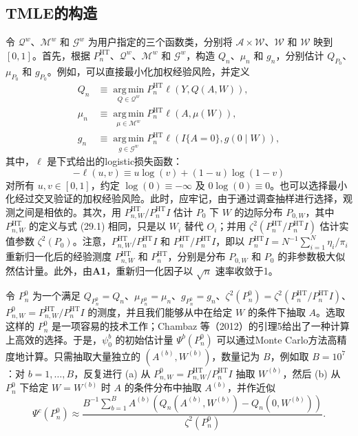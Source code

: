 \subsection{TMLE的构造}

令 $\mathcal Q^w$、$\mathcal M^w$ 和 $\mathcal G^w$ 为用户指定的三个函数类，分别将 $\mathcal A\times\mathcal W$、$\mathcal W$ 和 $\mathcal W$ 映到 $[0,1]$。首先，根据 $P_n^{\mathrm{HT}}$、$\mathcal Q^w$、$\mathcal M^w$ 和 $\mathcal G^w$，构造 $Q_n$、$\mu_n$ 和 $g_n$，分别估计 $Q_{P_0}$、$\mu_{P_0}$ 和 $g_{P_0}$。例如，可以直接最小化加权经验风险，并定义
\[
\begin{aligned}
Q_n&\equiv\operatorname*{arg\,min}_{Q\in\mathcal Q^w}
P_n^{\mathrm{HT}}\ell(Y,Q(A,W)),\\
\mu_n&\equiv\operatorname*{arg\,min}_{\mu\in\mathcal M^w}
P_n^{\mathrm{HT}}\ell(A,\mu(W)),\\
g_n&\equiv\operatorname*{arg\,min}_{g\in\mathcal G^w}
P_n^{\mathrm{HT}}\ell(I\{A=0\},g(0\mid W)),
\end{aligned}
\]
其中，$\ell$ 是下式给出的logistic损失函数：
\[
-\ell(u,v)\equiv u\log(v)+(1-u)\log(1-v)
\]
对所有 $u,v\in[0,1]$，约定 $\log(0)\equiv-\infty$ 及 $0\log(0)\equiv0$。也可以选择最小化经过交叉验证的加权经验风险。此时，应牢记，由于通过调查抽样进行选择，观测之间是相依的。其次，用 $P_{n,W}^{\mathrm{HT}}/P_n^{\mathrm{HT}}I$ 估计 $P_0$ 下 $W$ 的边际分布 $P_{0,W}$，其中 $P_{n,W}^{\mathrm{HT}}$ 的定义与式 (29.1) 相同，只是以 $W_i$ 替代 $O_i$；并用 $\zeta^2(P_n^{\mathrm{HT}}/P_n^{\mathrm{HT}}I)$ 估计实值参数 $\zeta^2(P_0)$。注意，$P_{n,W}^{\mathrm{HT}}/P_n^{\mathrm{HT}}I$ 和 $P_n^{\mathrm{HT}}/P_n^{\mathrm{HT}}I$，即以 $P_n^{\mathrm{HT}}I=N^{-1}\sum_{i=1}^N\eta_i/\pi_i$ 重新归一化后的经验测度 $P_{n,W}^{\mathrm{HT}}$ 和 $P_n^{\mathrm{HT}}$，分别是分布 $P_{0,W}$ 和 $P_0$ 的非参数极大似然估计量。此外，由\textbf{A1}，重新归一化因子以 $\sqrt n$ 速率收敛于1。

令 $P_n^0$ 为一个满足 $Q_{P_n^0}=Q_n$、$\mu_{P_n^0}=\mu_n$、$g_{P_n^0}=g_n$、$\zeta^2(P_n^0)=\zeta^2(P_n^{\mathrm{HT}}/P_n^{\mathrm{HT}}I)$、$P_{n,W}^0=P_{n,W}^{\mathrm{HT}}/P_n^{\mathrm{HT}}I$ 的测度，并且我们能够从中在给定 $W$ 的条件下抽取 $A$。选取这样的 $P_n^0$ 是一项容易的技术工作；Chambaz 等（2012）的引理5给出了一种计算上高效的选择。于是，$\psi_0^b$ 的初始估计量 $\Psi^b(P_n^0)$ 可以通过Monte Carlo方法高精度地计算。只需抽取大量独立的 $(A^{(b)},W^{(b)})$，数量记为 $B$，例如取 $B=10^7$：对 $b=1,\ldots,B$，反复进行 (a) 从 $P_{n,W}^0=P_{n,W}^{\mathrm{HT}}/P_n^{\mathrm{HT}}I$ 抽取 $W^{(b)}$，然后 (b) 从 $P_n^0$ 下给定 $W=W^{(b)}$ 时 $A$ 的条件分布中抽取 $A^{(b)}$，并作近似
\[
\Psi^c(P_n^0)\approx
\frac{B^{-1}\sum_{b=1}^BA^{(b)}\left(Q_n(A^{(b)},W^{(b)})-Q_n(0,W^{(b)})\right)}{\zeta^2(P_n^0)}.
\]

